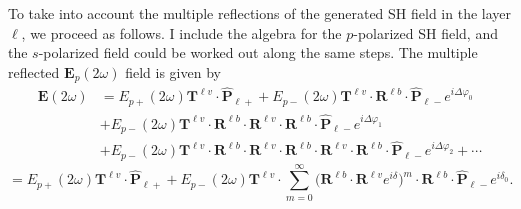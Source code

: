 To take into account the multiple reflections of the generated SH field in the
layer $\ell$, we proceed as follows. I include the algebra for the $p$-polarized
SH field, and the $s$-polarized field could be worked out along the same steps.
The multiple reflected $\mathbf{E}_{p}(2\omega)$ field is given by
\begin{equation*}\label{eq:E2wcomplete}
\begin{split}
\mathbf{E}(2\omega) 
&= E_{p+}(2\omega)\mathbf{T}^{\ell v}\cdot\hat{\mathbf{P}}_{\ell +}
 + E_{p-}(2\omega)\mathbf{T}^{\ell v}
\cdot\mathbf{R}^{\ell b}\cdot\hat{\mathbf{P}}_{\ell-}e^{i\Delta\varphi_{0}}\\
&+ E_{p-}(2\omega)\mathbf{T}^{\ell v}
\cdot\mathbf{R}^{\ell b}\cdot\mathbf{R}^{\ell v}
\cdot\mathbf{R}^{\ell b}\cdot\hat{\mathbf{P}}_{\ell-}e^{i\Delta\varphi_{1}}
\\
&+ E_{p-}(2\omega)\mathbf{T}^{\ell v}
\cdot\mathbf{R}^{\ell b}\cdot\mathbf{R}^{\ell v}
\cdot\mathbf{R}^{\ell b}\cdot\mathbf{R}^{\ell v}
\cdot\mathbf{R}^{\ell b}\cdot\hat{\mathbf{P}}_{\ell-}e^{i\Delta\varphi_{2}}
+\cdots
\end{split}
\end{equation*} 
\begin{equation}
= E_{p+}(2\omega)\mathbf{T}^{\ell v}\cdot\hat{\mathbf{P}}_{\ell +}
+ E_{p-}(2\omega) \mathbf{T}^{\ell v}
\cdot\sum_{m=0}^\infty  
\big(
\mathbf{R}^{\ell b}\cdot\mathbf{R}^{\ell v} 
e^{i\delta}\Big)^m 
\cdot\mathbf{R}^{\ell b}\cdot\hat{\mathbf{P}}_{\ell-}e^{i\delta_{0}}.
\end{equation}


